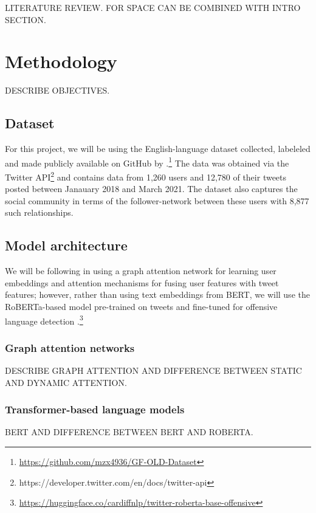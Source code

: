 \documentclass[letterpaper]{article} %
\begin{document}
LITERATURE REVIEW. FOR SPACE CAN BE COMBINED WITH INTRO SECTION.

\section{Methodology}

DESCRIBE OBJECTIVES.

\subsection{Dataset}

For this project, we will be using the English-language dataset collected, labeleled and made publicly available on GitHub by \citet{Miao2022}.\footnote{\url{https://github.com/mzx4936/GF-OLD-Dataset}} The data was obtained via the Twitter API\footnote{https://developer.twitter.com/en/docs/twitter-api} and contains data from 1,260 users and 12,780 of their tweets posted between Janauary 2018 and March 2021. The dataset also captures the social community in terms of the follower-network between these users with 8,877 such relationships.  

\subsection{Model architecture}

We will be following \citet{Miao2022} in using a graph attention network for learning user embeddings and attention mechanisms for fusing user features with tweet features; however, rather than using text embeddings from BERT, we will use the RoBERTa-based model pre-trained on tweets and fine-tuned for offensive language detection \citep{Barbieri2020}.\footnote{\url{https://huggingface.co/cardiffnlp/twitter-roberta-base-offensive}}

\subsubsection{Graph attention networks}

DESCRIBE GRAPH ATTENTION AND DIFFERENCE BETWEEN STATIC AND DYNAMIC ATTENTION.

\subsubsection{Transformer-based language models}

BERT AND DIFFERENCE BETWEEN BERT AND ROBERTA.
\end{document}
